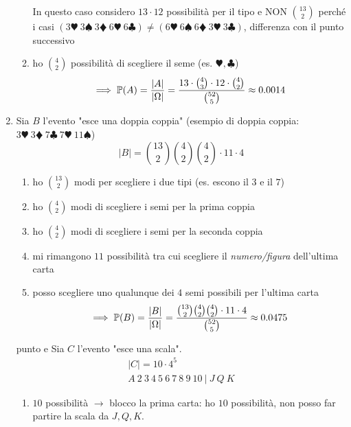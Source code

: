 \begin{enumerate}
\begin{enumerate}
\begin{oss}
In questo caso considero $13\cdot 12$ possibilità per il tipo e NON $\binom{13}{2}$ perché i casi $( 3\varheartsuit \ 3\spadesuit \ 3\vardiamondsuit \ 6\varheartsuit \ 6\clubsuit ) \neq ( 6\varheartsuit \ 6\spadesuit \ 6\vardiamondsuit \ 3\varheartsuit \ 3\clubsuit )$, differenza con il punto successivo
\end{oss}
\item ho $\binom{4}{2}$ possibilità di scegliere il seme (es. $\varheartsuit ,\clubsuit $)\begin{equation*}
\implies \mathbb{P}( A) =\frac{| A| }{| \Omega | } =\frac{13\cdot \binom{4}{3} \cdot 12\cdot \binom{4}{2}}{\binom{52}{5}} \approx 0.0014
\end{equation*}
\end{enumerate}
\item Sia $B$ l'evento "esce una doppia coppia" (esempio di doppia coppia: $3\varheartsuit \ 3\vardiamondsuit \ 7\clubsuit \ 7\varheartsuit \ 11\spadesuit $)\begin{equation*}
| B| =\binom{13}{2}\binom{4}{2}\binom{4}{2} \cdot 11\cdot 4
\end{equation*}
\begin{enumerate}
\item ho $\binom{13}{2}$ modi per scegliere i due tipi (es. escono il $3$ e il $7$)
\item ho $\binom{4}{2}$ modi di scegliere i semi per la prima coppia
\item ho $\binom{4}{2}$ modi di scegliere i semi per la seconda coppia
\item mi rimangono $11$ possibilità tra cui scegliere il \textit{numero/figura} dell'ultima carta
\item posso scegliere uno qualunque dei $4$ semi possibili per l'ultima carta\begin{equation*}
\implies \mathbb{P}( B) =\frac{| B| }{| \Omega | } =\frac{\binom{13}{2}\binom{4}{2}\binom{4}{2} \cdot 11\cdot 4}{\binom{52}{5}} \approx 0.0475
\end{equation*}
\end{enumerate}
\item [punto e] Sia $C$ l'evento "esce una scala".\begin{gather*}
| C| =10\cdot 4^{5}\\
A\ 2\ 3\ 4\ 5\ 6\ 7\ 8\ 9\ 10\ |\ J\ Q\ K
\end{gather*}
\begin{enumerate}
\item $10$ possibilità $\rightarrow $ blocco la prima carta: ho $10$ possibilità, non posso far partire la scala da $J,Q,K$.

\end{enumerate}
\end{enumerate}

